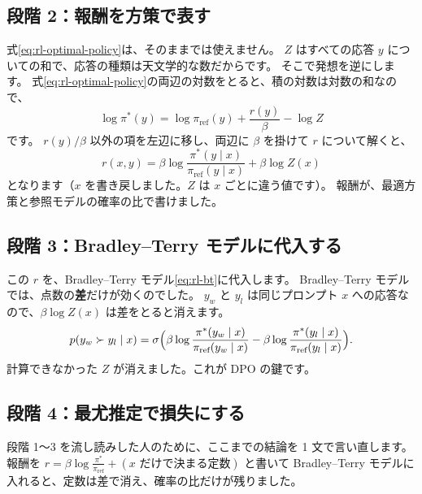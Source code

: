 \subsection{段階 2：報酬を方策で表す}

式\eqref{eq:rl-optimal-policy}は、そのままでは使えません。
$Z$ はすべての応答 $y$ についての和で、応答の種類は天文学的な数だからです。
そこで発想を逆にします。
式\eqref{eq:rl-optimal-policy}の両辺の対数をとると、積の対数は対数の和なので、
\begin{equation*}
\log\pi^\ast(y)=\log\pi_{\text{ref}}(y)+\frac{r(y)}{\beta}-\log Z
\end{equation*}
です。
$r(y)/\beta$ 以外の項を左辺に移し、両辺に $\beta$ を掛けて $r$ について解くと、
\begin{equation}
r(x,y)=\beta\log\frac{\pi^\ast(y\mid x)}{\pi_{\text{ref}}(y\mid x)}+\beta\log Z(x)
\label{eq:rl-implicit-reward}
\end{equation}
となります（$x$ を書き戻しました。$Z$ は $x$ ごとに違う値です）。
報酬が、最適方策と参照モデルの確率の比で書けました。

\subsection{段階 3：Bradley--Terry モデルに代入する}

この $r$ を、Bradley--Terry モデル\eqref{eq:rl-bt}に代入します。
Bradley--Terry モデルでは、点数の\textbf{差}だけが効くのでした。
$y_w$ と $y_l$ は同じプロンプト $x$ への応答なので、$\beta\log Z(x)$ は差をとると消えます。
\begin{equation*}
p(y_w\succ y_l\mid x)=\sigma\Bigl(\beta\log\frac{\pi^\ast(y_w\mid x)}{\pi_{\text{ref}}(y_w\mid x)}-\beta\log\frac{\pi^\ast(y_l\mid x)}{\pi_{\text{ref}}(y_l\mid x)}\Bigr).
\end{equation*}
計算できなかった $Z$ が消えました。これが DPO の鍵です。

\subsection{段階 4：最尤推定で損失にする}

段階 1〜3 を流し読みした人のために、ここまでの結論を 1 文で言い直します。
報酬を $r=\beta\log\frac{\pi^\ast}{\pi_{\text{ref}}}+(\text{$x$ だけで決まる定数})$ と書いて Bradley--Terry モデルに入れると、定数は差で消え、確率の比だけが残りました。

